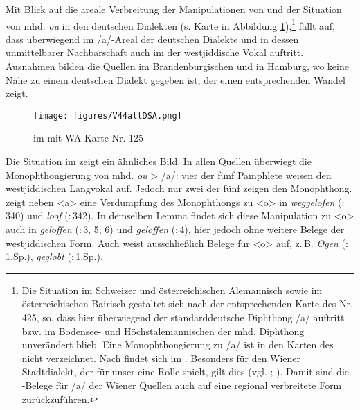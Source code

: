  Mit Blick auf die areale Verbreitung der Manipulationen von  und der Situation von mhd. \textit{ou} in den deutschen Dialekten (s. Karte in Abbildung \ref{karteV44DSA}),\footnote{Die Situation im Schweizer und österreichischen Alemannisch sowie im österreichischen Bairisch gestaltet sich nach der entsprechenden Karte des  Nr. 425, so, dass hier überwiegend der standarddeutsche Diphthong /a/ auftritt bzw. im Bodensee- und Höchstalemannischen der mhd. Diphthong unverändert blieb. Eine Monophthongierung zu  /a\textlengthmark/ ist in den Karten des  nicht verzeichnet. Nach \textcite[235]{Schirmunski1962} findet sich im . Besonders für den Wiener Stadtdialekt, 
   der für unser  eine Rolle spielt, gilt dies (vgl. \cite[60–63]{SchusterSchikola1956}; \cite[33]{Bacciocco1890}). Damit sind die -Belege für /a\textlengthmark/ der Wiener Quellen auch auf eine regional verbreitete Form zurückzuführen.} fällt auf, dass überwiegend im /a\textlengthmark/-Areal der deutschen Dialekte und in dessen unmittelbarer Nachbarschaft auch im  der westjiddische Vokal auftritt. Ausnahmen bilden die Quellen im Brandenburgischen und in Hamburg, wo keine Nähe zu einem deutschen Dialekt gegeben ist, der einen entsprechenden Wandel zeigt.\\
 
 

 	
		\begin{figure}[h!]
		\centering
\texttt{[image: figures/V44allDSA.png]}
		\caption{\label{karteV44DSA}   im  mit WA Karte Nr. 125}
		\end{figure}
\FloatBarrier
 
 Die Situation im  zeigt ein ähnliches Bild. In allen Quellen überwiegt  die Monophthongierung von mhd. \textit{ou} >  /a\textlengthmark/: vier der fünf Pamphlete weisen den westjiddischen Langvokal auf. Jedoch nur zwei der fünf  zeigen den Monophthong.  zeigt neben <a> eine Verdumpfung des Monophthongs zu <o> in \textit{weggelofen}  (:\, 340) und \textit{loof}  (:\,342). In demselben Lemma findet sich diese Manipulation zu <o> auch in  \textit{geloffen}  (:\,3, 5, 6) und  \textit{geloffen}  (:\,4), hier jedoch ohne weitere Belege der westjiddischen Form. Auch  weist ausschließlich Belege für <o> auf, z.\,B.  \textit{Ogen}  (:\,1.Sp.), \textit{geglobt}  (:\,1.Sp.).


